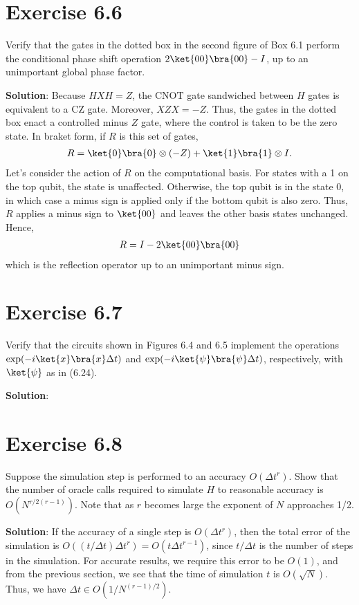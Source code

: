 \documentclass{book}
\begin{document}
\section*{Exercise 6.6} 
    Verify that the gates in the dotted box in the second figure of Box 6.1 perform the conditional phase shift operation $2\ket{00}\bra{00}-I$, up to an unimportant global phase factor.
    
    \textbf{Solution}: Because $HXH = Z$, the $\mathrm{CNOT}$ gate sandwiched between $H$ gates is equivalent to a CZ gate. Moreover, $XZX = -Z$. Thus, the gates in the dotted box enact a controlled minus $Z$ gate, where the control is taken to be the zero state. In braket form, if $R$ is this set of gates,
    \begin{align}
        R = \ket{0}\bra{0} \otimes (-Z) + \ket{1}\bra{1}\otimes I.
    \end{align}
    Let's consider the action of $R$ on the computational basis. For states with a 1 on the top qubit, the state is unaffected. Otherwise, the top qubit is in the state 0, in which case a minus sign is applied only if the bottom qubit is also zero. Thus, $R$ applies a minus sign to $\ket{00}$ and leaves the other basis states unchanged. Hence,
    \begin{align}
        R = I - 2\ket{00}\bra{00}
    \end{align}
    which is the reflection operator up to an unimportant minus sign. 

\section*{Exercise 6.7}
    Verify that the circuits shown in Figures 6.4 and 6.5 implement the operations $\exp(-i\ket{x}\bra{x}\Delta t)$ and $\exp(-i\ket{\psi}\bra{\psi}\Delta t)$, respectively, with $\ket{\psi}$ as in (6.24).
    
    \textbf{Solution}:

\section*{Exercise 6.8}
    Suppose the simulation step is performed to an accuracy $O(\Delta t^r)$. Show that the number of oracle calls required to simulate $H$ to reasonable accuracy is $O(N^{r/2(r-1)})$. Note that as $r$ becomes large the exponent of $N$ approaches 1/2.
    
    \textbf{Solution}: If the accuracy of a single step is $O(\Delta t^r)$, then the total error of the simulation is $O((t/\Delta t) \Delta t^r)=O(t\Delta t^{r-1})$, since $t/\Delta t$ is the number of steps in the simulation. For accurate results, we require this error to be $O(1)$, and from the previous section, we see that the time of simulation $t$ is $O(\sqrt{N})$. Thus, we have $\Delta t \in O(1/N^{(r-1)/2})$. 
\end{document}
